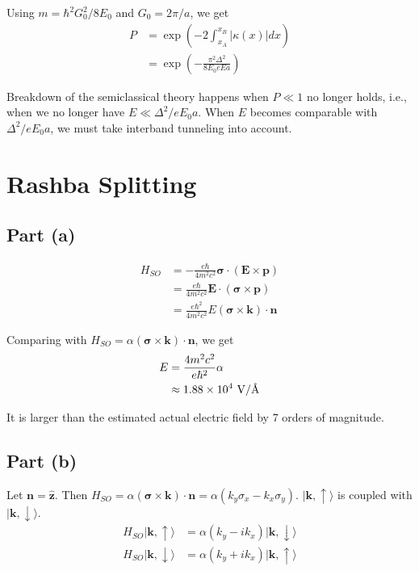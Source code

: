 \documentclass{article}
\begin{document}
Using $m=\hbar^2G_0^2/8E_0$ and $G_0=2\pi/a$, we get
\begin{align*}
P&=\exp\left(-2\int_{x_A}^{x_B}|\kappa(x)|dx\right)\\
&=\exp\left(-\frac{\pi^2\Delta^2}{8E_0eEa}\right)
\end{align*}

Breakdown of the semiclassical theory happens when $P\ll1$ no longer holds, i.e., when we no longer have $E\ll\Delta^2/eE_0a$. When $E$ becomes comparable with $\Delta^2/eE_0a$, we must take interband tunneling into account.

\section{Rashba Splitting}
\subsection{Part (a)}
\begin{align*}
H_{SO}&=-\frac{e\hbar}{4m^2c^2}\bm{\sigma}\cdot(\mathbf{E}\times\mathbf{p})\\
&=\frac{e\hbar}{4m^2c^2}\mathbf{E}\cdot(\bm{\sigma}\times\mathbf{p})\\
&=\frac{e\hbar^2}{4m^2c^2}E(\bm{\sigma}\times\mathbf{k})\cdot\mathbf{n}
\end{align*}

Comparing with $H_{SO}=\alpha(\bm{\sigma}\times\mathbf{k})\cdot\mathbf{n}$, we get
\begin{align*}
E&=\frac{4m^2c^2}{e\hbar^2}\alpha\\
&\approx1.88\times 10^4\textup{ V/\AA}
\end{align*}

It is larger than the estimated actual electric field by 7 orders of magnitude.

\subsection{Part (b)}
Let $\mathbf{n}=\hat{\mathbf{z}}$. Then $H_{SO}=\alpha(\bm{\sigma}\times\mathbf{k})\cdot\mathbf{n}=\alpha(k_y\sigma_x-k_x\sigma_y)$. $|\mathbf{k},\uparrow\rangle$ is coupled with $|\mathbf{k},\downarrow\rangle$.
\begin{align*}
H_{SO}|\mathbf{k},\uparrow\rangle&=\alpha(k_y-ik_x)|\mathbf{k},\downarrow\rangle\\
H_{SO}|\mathbf{k},\downarrow\rangle&=\alpha(k_y+ik_x)|\mathbf{k},\uparrow\rangle
\end{align*}
\end{document}
